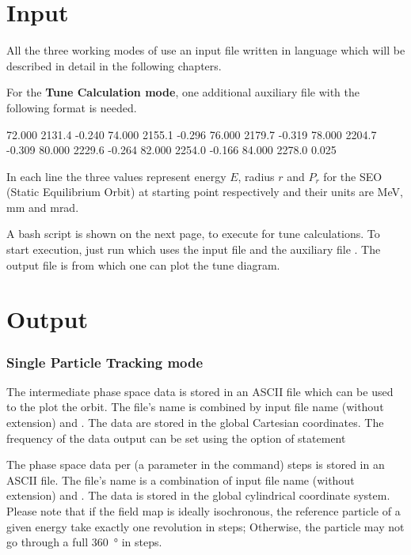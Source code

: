\section{Input}
All the three working modes of \opalcycl use an input file written in \mad language which will be described in detail in the following chapters.

For the  {\bfseries Tune Calculation mode}, one additional auxiliary file with the following format is needed.
\begin{example}
   72.000 2131.4   -0.240
   74.000 2155.1   -0.296
   76.000 2179.7   -0.319
   78.000 2204.7   -0.309
   80.000 2229.6   -0.264
   82.000 2254.0   -0.166
   84.000 2278.0    0.025
\end{example}
In each line the three values represent energy $E$, radius $r$ and $P_r$ for the SEO (Static Equilibrium Orbit)
at starting point respectively and their units are \si{\mega\electronvolt}, \si{\milli\meter} and \si{\milli\radian}.

A bash script  is shown on the next page, to execute \opalcycl for tune calculations.
To start execution, just run  which uses the input file  and the auxiliary file .
The output file is  from which one can plot the tune diagram.


\section{Output}
\subsubsection{Single Particle Tracking mode}

The intermediate phase space data is stored in an ASCII file which can be used to
the plot the orbit. The file's name is combined by input file name (without extension) and .
The data are stored in the global Cartesian coordinates.
The frequency of the data output can be set using the  option  of  statement 

The phase space data per  (a parameter in the  command) steps is stored in an ASCII file.
The file's name is a combination of input file name (without extension) and .
The data is stored in the global cylindrical coordinate system.
Please note that if the field map is ideally isochronous, the reference particle of a given energy take exactly one revolution in  steps;
Otherwise, the particle may not go through a full \SI{360}{\degree} in  steps.

